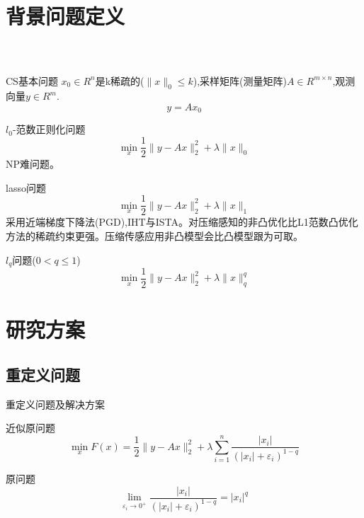 \documentclass[compress]{beamer}%
\begin{document}
\section{背景问题定义}
\begin{frame}
	\frametitle{\secname~ }
	\begin{block}{CS基本问题}
		$x _ { 0 } \in R ^ { n }$是k稀疏的($\| x \| _ { 0}\leq k$),采样矩阵(测量矩阵)$A \in R ^ { m \times n }$,观测向量$y \in R ^ { m }$.
		$$y = A x _ { 0 }$$
	\end{block}
	\begin{block}{$l_0$-范数正则化问题}
$$\operatorname { min } _ { x } \frac { 1 } { 2 } \| y - A x \| _ { 2 } ^ { 2 } + \lambda \| x \| _ { 0 }$$
NP难问题。
\end{block}
\end{frame}
\begin{frame}

	\begin{block}{lasso问题}
$$\operatorname { min } _ { x } \frac { 1 } { 2 } \| y - A x \| _ { 2 } ^ { 2 } + \lambda \| x \| _ { 1 }$$
采用近端梯度下降法(PGD),IHT与ISTA。对压缩感知的非凸优化比L1范数凸优化方法的稀疏约束更强。压缩传感应用非凸模型会比凸模型跟为可取。
\end{block}
	\begin{block}{$l_q$问题($0<q\leq 1$)}
	$$\operatorname { min } _ { x } \frac { 1 } { 2 } \| y - A x \| _ { 2 } ^ { 2 } + \lambda \| x \| _ { q } ^ { q }$$
\end{block}	
\end{frame}
\section{研究方案}
\subsection{重定义问题}
\begin{frame}{重定义问题及解决方案}
  \begin{block}{近似原问题}
$$\operatorname { min } _ { x } {F ( x )} = \frac { 1 } { 2 } \| y - A x \| _ { 2 } ^ { 2 } + \lambda \sum _ { i = 1 } ^ { n } \frac { | x _ { i } | } { ( | x _ { i } | + \varepsilon _ { i } ) ^ { 1 - q } }$$
  \end{block}
  \begin{block}{原问题}
$$\operatorname { lim } _ { \varepsilon _ { i } \rightarrow 0 ^ { + } } \frac { | x _ { i } | } { ( | x _ { i } | + \varepsilon _ { i } ) ^ { 1 - q } } = | x _ { i } | ^ { q }$$
  \end{block}
\end{frame}
\end{document}
